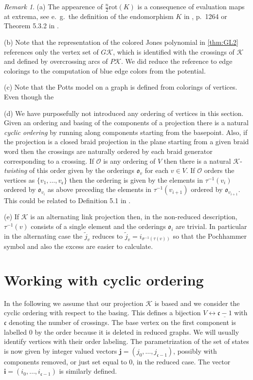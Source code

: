 \documentclass[11pt]{article}
\theoremstyle{definition}
\theoremstyle{remark}
\newtheorem*{rem}{Remark}
\theoremstyle{remark}
\begin{document}
\begin{rem} (a) The appearence of $\frac{n}{2}\textrm{rot}(K)$ is a consequence of evaluation maps at extrema, see e.\ g.\ the definition of the endomorphism $K$ in \cite{G}, p.\ 1264 or Theorem 5.3.2 in \cite{CP}.

\noindent (b) Note that the representation of the colored Jones polynomial in \ref{thm:GL2} references only the vertex set of $G\mathcal{K}$, which is identified with the crossings of $\mathcal{K}$ and defined by overcrossing arcs of $P\mathcal{K}$. 
We did reduce the reference to edge colorings to the computation of blue edge colors from the potential. 

\noindent (c) Note that the Potts model on a graph is defined from colorings of vertices. Even though the 

\noindent (d) We have purposefully not introduced any ordering of vertices in this section. Given an ordering and basing of the components of a projection there is a natural \textit{cyclic ordering} by running along components starting from the basepoint. Also, if the projection is a closed braid projection in the plane starting from a given braid word then the crossings are naturally ordered by each braid generator corresponding to a crossing. If $\mathcal{O}$ is any ordering of $V$ then there is a natural $\mathcal{K}$-\textit{twisting} of this order given by the orderings $\mathfrak{o}_v$ for each $v\in V$. If $\mathcal{O}$ orders the vertices as 
$\{v_1,\ldots ,v_{\mathfrak{c}}\}$ then the ordering is given by the elements in $\tau^{-1}(v_i)$ ordered by $\mathfrak{o}_{v_i}$ as above preceding the elements in $\tau^{-1}(v_{i+1})$ ordered by $\mathfrak{o}_{v_{i+1}}$. This could be related to Definition 5.1 in \cite{GL}.

\noindent (e) If $\mathcal{K}$ is an alternating link projection then, in the non-reduced description,  $\tau^{-1}(v)$ consists of a single element and the orderings $\mathfrak{o}_i$ are trivial. In particular in the alternating case the $\tilde{j}_v$ reduces to $\tilde{j}_v=i_{\sigma^{-1}(\tau (v))}$ so that the Pochhammer symbol and also the excess are easier to calculate. 
\end{rem}

\section{Working with cyclic ordering}

In the following we assume that our projection $\mathcal{K}$ is based and we consider the cyclic ordering with respect to the basing. 
This defines a bijection $V\leftrightarrow \underline{\mathfrak{c}-1}$ with $\mathfrak{c}$ denoting the number of crossings. The base vertex on the first component is labelled $0$ by the order because it is deleted in reduced graphs. We will usually identify vertices with their order labeling. The parametrization of the set of states is now given by integer valued vectors
$\mathbf{j}=(j_0,\ldots ,j_{\mathfrak{c}-1})$, possibly with components removed, or just set equal to $0$, in the reduced case. The vector $\mathbf{i}=(i_0,\ldots ,i_{\mathfrak{c}-1})$ is similarly defined. 
\end{document}
